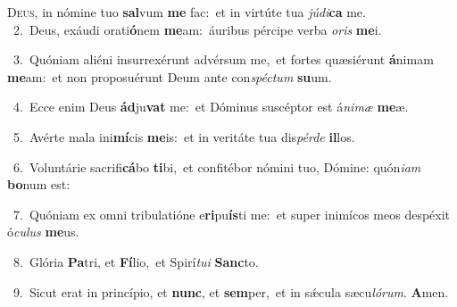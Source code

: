 \lettrine{\initial\textcolor{\initialcolor}{D}}{eus,} in nómine tuo \textbf{sal}\-vum \textbf{me} fac:~\star et in virtúte tua \textit{jú}\-\textit{di}\textbf{ca} me.\\
{\numbfont\textcolor{\numbcolor}{~2.}}~Deus, exáudi orati\-\textbf{ó}\-nem \textbf{me}\-am:~\star áuribus pércipe verba \textit{o}\-\textit{ris} \textbf{me}\-i.\par
{\numbfont\textcolor{\numbcolor}{~3.}}~Quóniam aliéni insurrexérunt advérsum me,~\dagger et fortes quæsiérunt \textbf{á}\-nimam \textbf{me}\-am:~\star et non proposuérunt Deum ante con\-\textit{spéc}\-\textit{tum} \textbf{su}\-um.\par
{\numbfont\textcolor{\numbcolor}{~4.}}~Ecce enim Deus \textbf{ád}\-ju\textbf{vat} me:~\star et Dóminus suscéptor est á\-\textit{ni}\-\textit{mæ} \textbf{me}\-æ.\par
{\numbfont\textcolor{\numbcolor}{~5.}}~Avérte mala ini\-\textbf{mí}\-cis \textbf{me}\-is:~\star et in veritáte tua dis\-\textit{pér}\-\textit{de} \textbf{il}\-los.\par
{\numbfont\textcolor{\numbcolor}{~6.}}~Voluntárie sacrifi\-\textbf{cá}\-bo \textbf{ti}\-bi,~\star et confitébor nómini tuo, Dómine: quón\-\textit{i}\-\textit{am} \textbf{bo}\-num est:\par
{\numbfont\textcolor{\numbcolor}{~7.}}~Quóniam ex omni tribulatióne e\-\textbf{ri}\-pu\-\textbf{ís}\-ti me:~\star et super inimícos meos despéxit ó\-\textit{cu}\-\textit{lus} \textbf{me}\-us.\par
{\numbfont\textcolor{\numbcolor}{~8.}}~Glória \textbf{Pa}\-tri, et \textbf{Fí}\-lio,~\star et Spirí\-\textit{tu}\-\textit{i} \textbf{Sanc}\-to.\par
{\numbfont\textcolor{\numbcolor}{~9.}}~Sicut erat in princípio, et \textbf{nunc}\-, et \textbf{sem}\-per,~\star et in sǽcula sæcu\-\textit{ló}\-\textit{rum}. \textbf{A}\-men.\par
